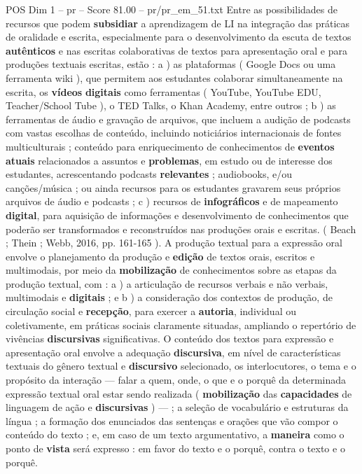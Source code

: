 \begin{textsample}{POS Dim 1 – pr – Score 81.00 – pr/pr\_em\_51.txt}
Entre as possibilidades de recursos que podem \textbf{subsidiar} a aprendizagem de LI na integração das práticas de oralidade e escrita, especialmente para o desenvolvimento da escuta de textos \textbf{autênticos} e nas escritas colaborativas de textos para apresentação oral e para produções textuais escritas, estão : a ) as plataformas ( Google Docs ou uma ferramenta wiki ), que permitem aos estudantes colaborar simultaneamente na escrita, os \textbf{vídeos} \textbf{digitais} como ferramentas ( YouTube, YouTube EDU, Teacher/School Tube ), o TED Talks, o Khan Academy, entre outros ; b ) as ferramentas de áudio e gravação de arquivos, que incluem a audição de podcasts com vastas escolhas de conteúdo, incluindo noticiários internacionais de fontes multiculturais ; conteúdo para enriquecimento de conhecimentos de \textbf{eventos} \textbf{atuais} relacionados a assuntos e \textbf{problemas}, em estudo ou de interesse dos estudantes, acrescentando podcasts \textbf{relevantes} ; audiobooks, e/ou canções/música ; ou ainda recursos para os estudantes gravarem seus próprios arquivos de áudio e podcasts ; c ) recursos de \textbf{infográficos} e de mapeamento \textbf{digital}, para aquisição de informações e desenvolvimento de conhecimentos que poderão ser transformados e reconstruídos nas produções orais e escritas. ( Beach ; Thein ; Webb, 2016, pp. 161-165 ).
A produção textual para a expressão oral envolve o planejamento da produção e \textbf{edição} de textos orais, escritos e multimodais, por meio da \textbf{mobilização} de conhecimentos sobre as etapas da produção textual, com : a ) a articulação de recursos verbais e não verbais, multimodais e \textbf{digitais} ; e b ) a consideração dos contextos de produção, de circulação social e \textbf{recepção}, para exercer a \textbf{autoria}, individual ou coletivamente, em práticas sociais claramente situadas, ampliando o repertório de vivências \textbf{discursivas} significativas.
O conteúdo dos textos para expressão e apresentação oral envolve a adequação \textbf{discursiva}, em nível de características textuais do gênero textual e \textbf{discursivo} selecionado, os interlocutores, o tema e o propósito da interação — falar a quem, onde, o que e o porquê da determinada expressão textual oral estar sendo realizada ( \textbf{mobilização} das \textbf{capacidades} de linguagem de ação e \textbf{discursivas} ) — ; a seleção de vocabulário e estruturas da língua ; a formação dos enunciados das sentenças e orações que vão compor o conteúdo do texto ; e, em caso de um texto argumentativo, a \textbf{maneira} como o ponto de \textbf{vista} será expresso : em favor do texto e o porquê, contra o texto e o porquê.

\end{textsample}
